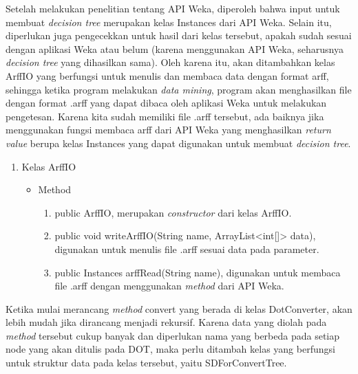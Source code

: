 	Setelah melakukan penelitian tentang API Weka, diperoleh bahwa input untuk membuat \textsl{decision tree} merupakan kelas Instances dari API Weka. Selain itu, diperlukan juga pengecekkan untuk hasil dari kelas tersebut, apakah sudah sesuai dengan aplikasi Weka atau belum (karena menggunakan API Weka, seharusnya \textsl{decision tree} yang dihasilkan sama). Oleh karena itu, akan ditambahkan kelas ArffIO yang berfungsi untuk menulis dan membaca data dengan format arff, sehingga ketika program melakukan \textsl{data mining}, program akan menghasilkan file dengan format .arff yang dapat dibaca oleh aplikasi Weka untuk melakukan pengetesan. Karena kita sudah memiliki file .arff tersebut, ada baiknya jika menggunakan fungsi membaca arff dari API Weka yang menghasilkan \textsl{return value} berupa kelas Instances yang dapat digunakan untuk membuat \textsl{decision tree}.

\begin{enumerate}
	\item Kelas ArffIO
	\begin{itemize}
		\item Method
		\begin{enumerate}
			\item public ArffIO, merupakan \textsl{constructor} dari kelas ArffIO.
			\item public void writeArffIO(String name, ArrayList<int[]> data), digunakan untuk menulis file .arff sesuai data pada parameter.
			\item public Instances arffRead(String name), digunakan untuk membaca file .arff dengan menggunakan \textsl{method} dari API Weka.
		\end{enumerate}
	\end{itemize}
\end{enumerate}

Ketika mulai merancang \textsl{method} convert yang berada di kelas DotConverter, akan lebih mudah jika dirancang menjadi rekursif. Karena data yang diolah pada \textsl{method}
tersebut cukup banyak dan diperlukan nama yang berbeda pada setiap node yang akan ditulis pada DOT, maka perlu ditambah kelas yang berfungsi untuk struktur data pada kelas tersebut, yaitu SDForConvertTree.

